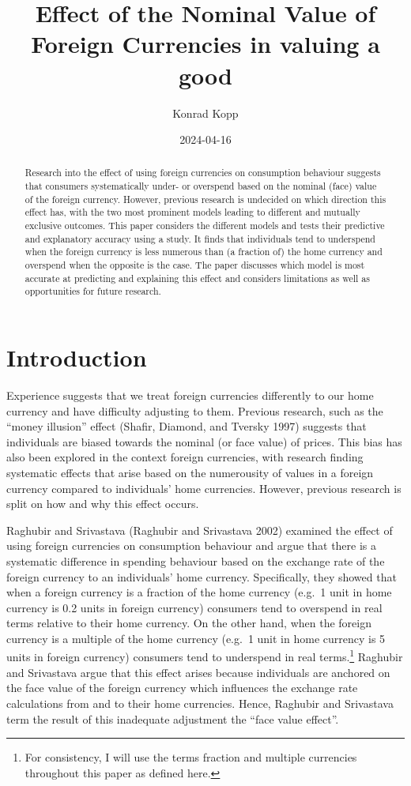 \documentclass[
]{report}
\title{Effect of the Nominal Value of Foreign Currencies in valuing a
good}
\author{Konrad Kopp}
\affil{%
                  University of Oxford
              }
\date{2024-04-16}
\renewcommand*\contentsname{Table of contents}
\newcommand\contentsname{Table of contents}
\begin{document}
\maketitle
\begin{abstract}
Research into the effect of using foreign currencies on consumption
behaviour suggests that consumers systematically under- or overspend
based on the nominal (face) value of the foreign currency. However,
previous research is undecided on which direction this effect has, with
the two most prominent models leading to different and mutually
exclusive outcomes. This paper considers the different models and tests
their predictive and explanatory accuracy using a study. It finds that
individuals tend to underspend when the foreign currency is less
numerous than (a fraction of) the home currency and overspend when the
opposite is the case. The paper discusses which model is most accurate
at predicting and explaining this effect and considers limitations as
well as opportunities for future research.
\end{abstract}

\renewcommand*\contentsname{Table of contents}
{
\hypersetup{linkcolor=}
\setcounter{tocdepth}{2}
\tableofcontents
}
\chapter{Introduction}\label{introduction}

Experience suggests that we treat foreign currencies differently to our
home currency and have difficulty adjusting to them. Previous research,
such as the ``money illusion'' effect (Shafir, Diamond, and Tversky
1997) suggests that individuals are biased towards the nominal (or face
value) of prices. This bias has also been explored in the context
foreign currencies, with research finding systematic effects that arise
based on the numerousity of values in a foreign currency compared to
individuals' home currencies. However, previous research is split on how
and why this effect occurs.

Raghubir and Srivastava (Raghubir and Srivastava 2002) examined the
effect of using foreign currencies on consumption behaviour and argue
that there is a systematic difference in spending behaviour based on the
exchange rate of the foreign currency to an individuals' home currency.
Specifically, they showed that when a foreign currency is a fraction of
the home currency (e.g.~1 unit in home currency is 0.2 units in foreign
currency) consumers tend to overspend in real terms relative to their
home currency. On the other hand, when the foreign currency is a
multiple of the home currency (e.g.~1 unit in home currency is 5 units
in foreign currency) consumers tend to underspend in real
terms.\footnote{For consistency, I will use the terms fraction and
  multiple currencies throughout this paper as defined here.} Raghubir
and Srivastava argue that this effect arises because individuals are
anchored on the face value of the foreign currency which influences the
exchange rate calculations from and to their home currencies. Hence,
Raghubir and Srivastava term the result of this inadequate adjustment
the ``face value effect''.
\end{document}
